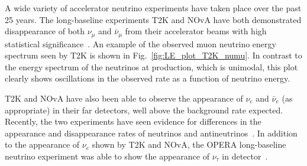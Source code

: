 A wide variety of accelerator neutrino experiments have taken place over the past 25 years. The long-baseline experiments T2K and NOvA have both demonstrated disappearance of both $\nu_{\mu}$ and $\bar{\nu}_{\mu}$ from their accelerator beams with high statistical significance~\cite{}. %
An example of the observed muon neutrino energy spectrum seen by T2K is shown in Fig.~\ref{fig:LE_plot_T2K_numu}. In contrast to the energy spectrum of the neutrinos at production, which is unimodal, this plot clearly shows oscillations in the observed rate as a function of neutrino energy. 

T2K and NOvA have also been able to observe the appearance of $\nu_{e}$ and $\bar{\nu}_{e}$ (as appropriate) in their far detectors, well above the background rate expected. Recently, the two experiments have seen evidence for differences in the appearance and disappearance rates of neutrinos and antineutrinos~\cite{}. %
In addition to the appearance of $\nu_{e}$ shown by T2K and NOvA, the OPERA long-baseline neutrino experiment was able to show the appearance of $\nu_{\tau}$ in detector~\cite{}. %
 

